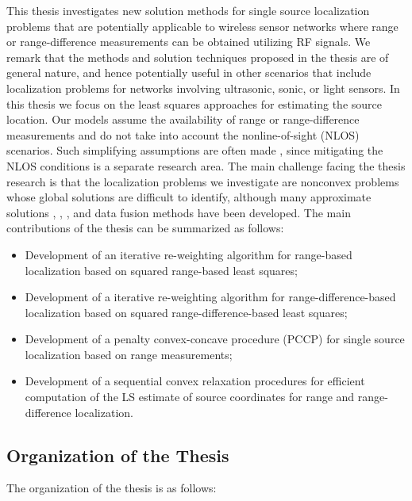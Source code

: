 This thesis investigates new solution methods for single source localization problems that are potentially applicable to wireless sensor networks where range or range-difference measurements can be obtained utilizing RF signals. We remark
that the methods and solution techniques proposed in the thesis are of general nature, and hence potentially useful in other scenarios that include localization problems for networks involving  ultrasonic, sonic, or light sensors. 
In this thesis we focus on the least squares approaches for estimating the source location. Our models assume the availability of range or range-difference measurements and do not take into account the nonline-of-sight (NLOS) scenarios. Such simplifying assumptions are often made \cite{Cheung}, \cite{classMDS} since mitigating the NLOS conditions is a separate research area. The main challenge facing the thesis research is that the localization problems we investigate
are nonconvex problems whose global solutions are difficult to identify, although many
approximate solutions \cite{Cheung}, \cite{LiHu},  \cite{SmithAbel}, and data fusion methods \cite{Sayed} have been developed. The main contributions of the thesis can be summarized as follows:

\begin{itemize}
\item
Development of an iterative re-weighting algorithm for range-based localization based on squared range-based least squares;

\item
Development of a iterative re-weighting algorithm for range-difference-based localization based on squared range-difference-based least squares;

\item
Development of a penalty convex-concave procedure (PCCP) for single source localization based on range measurements;

\item
Development of a sequential convex relaxation procedures for efficient computation of the LS estimate of source coordinates for range and range-difference localization.


\end{itemize}


\subsection{Organization of the Thesis} \label{organization}

The organization of the thesis is  as follows:


